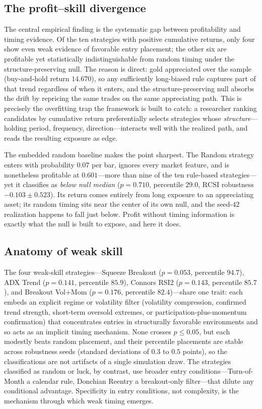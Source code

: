 \documentclass[preprint,12pt]{elsarticle}
\theoremstyle{definition}
\begin{document}
\subsection{The profit--skill divergence}

The central empirical finding is the systematic gap between profitability and timing evidence. Of the ten strategies with positive cumulative returns, only four show even weak evidence of favorable entry placement; the other six are profitable yet statistically indistinguishable from random timing under the structure-preserving null. The reason is direct: gold appreciated over the sample (buy-and-hold return $14.670$), so any sufficiently long-biased rule captures part of that trend regardless of when it enters, and the structure-preserving null absorbs the drift by repricing the same trades on the same appreciating path. This is precisely the overfitting trap the framework is built to catch: a researcher ranking candidates by cumulative return preferentially selects strategies whose \emph{structure}---holding period, frequency, direction---interacts well with the realized path, and reads the resulting exposure as edge.

The embedded random baseline makes the point sharpest. The Random strategy enters with probability $0.07$ per bar, ignores every market feature, and is nonetheless profitable at $0.601$---more than nine of the ten rule-based strategies---yet it classifies as \emph{below null median} ($p=0.710$, percentile $29.0$, $\mathrm{RCSI}$ robustness $-0.103\pm0.523$). Its return comes entirely from long exposure to an appreciating asset; its random timing sits near the center of its own null, and the seed-$42$ realization happens to fall just below. Profit without timing information is exactly what the null is built to expose, and here it does.

\subsection{Anatomy of weak skill}

The four weak-skill strategies---Squeeze Breakout ($p=0.053$, percentile $94.7$), ADX Trend ($p=0.141$, percentile $85.9$), Connors RSI2 ($p=0.143$, percentile $85.7$), and Breakout Vol+Mom ($p=0.176$, percentile $82.4$)---share one trait: each embeds an explicit regime or volatility filter (volatility compression, confirmed trend strength, short-term oversold extremes, or participation-plus-momentum confirmation) that concentrates entries in structurally favorable environments and so acts as an implicit timing mechanism. None crosses $p\le0.05$, but each modestly beats random placement, and their percentile placements are stable across robustness seeds (standard deviations of $0.3$ to $0.5$ points), so the classifications are not artifacts of a single simulation draw. The strategies classified as random or luck, by contrast, use broader entry conditions---Turn-of-Month a calendar rule, Donchian Reentry a breakout-only filter---that dilute any conditional advantage. Specificity in entry conditions, not complexity, is the mechanism through which weak timing emerges.
\end{document}
